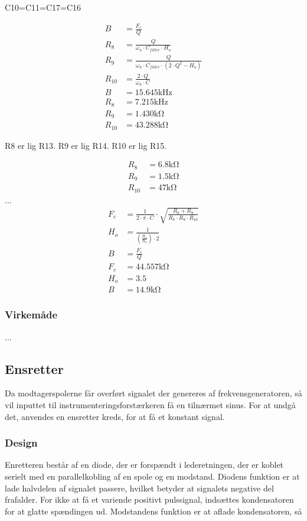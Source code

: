 C10=C11=C17=C16

\begin{align}
B & = \frac{F_c}{Q} \\
R_8 & = \frac{Q}{\omega_n \cdot C_{filter} \cdot H_o } \\
R_9 & = \frac{Q}{ \omega_n \cdot C_{filter} \cdot \left( 2 \cdot Q^2 - H_o \right) } \\
R_{10} & = \frac{2 \cdot Q}{ \omega_n \cdot C} \\
B & = 15.645 \si{\kilo\hertz} \nonumber \\
R_8 & = 7.215 \si{\kilo\hertz} \nonumber \\
R_9 & = 1.430 \si{\kilo\ohm} \nonumber \\
R_{10} & = 43.288 \si{\kilo\ohm} \nonumber 
\end{align}

R8 er lig R13. R9 er lig R14. R10 er lig R15.

\begin{align}
	R_8 & = 6.8 \si{\kilo\ohm} \nonumber \\
	R_9 & = 1.5 \si{\kilo\ohm} \nonumber \\
	R_{10} & = 47 \si{\kilo\ohm} \nonumber
\end{align}
...
\begin{align}
	F_c & = \frac{1}{2 \cdot \pi \cdot C} \cdot \sqrt{\frac{R_8+R_9}{R_8 \cdot R_9 \cdot R_{10}}} \\
	H_o & = \frac{1}{\left( \frac{R_1}{R_3} \right) \cdot 2} \\
	B & = \frac{F_c}{Q} \\
	F_c & = 44.557 \si{\kilo\ohm} \nonumber \\
	H_o & = 3.5 \nonumber \\
	B & = 14.9 \si{\kilo\ohm} \nonumber
\end{align}
\subsubsection{Virkemåde}
...
\subsection{Ensretter}
Da modtagerspolerne får overført signalet der genereres af frekvensgeneratoren, så vil inputtet til instrumenteringsforstærkeren få en tilnærmet sinus. 
For at undgå det, anvendes en ensretter kreds, for at få et konstant signal.

\subsubsection{Design}
Enretteren består af en diode, der er forspændt i lederetningen, der er koblet serielt med en parallelkobling af en spole og en modstand. 
Diodens funktion er at lade halvdelen af signalet passere, hvilket betyder at signalets negative del frafalder. 
For ikke at få et variende positivt pulssignal, indsættes kondensatoren for at glatte spændingen ud. Modstandens funktion er at aflade kondensatoren, så


